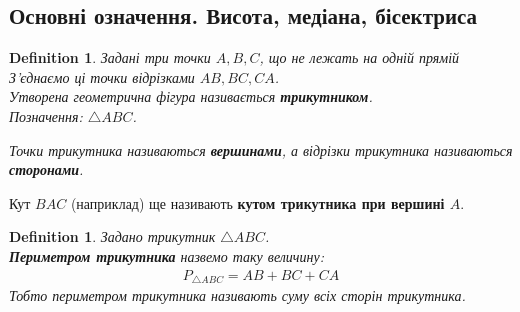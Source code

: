 \documentclass[a4paper, 10pt]{article}
\theoremstyle{theoremdd}
\theoremstyle{theoremdd}
\theoremstyle{theoremdd}
\newtheorem{definition}[theorem]{Definition}
\theoremstyle{theoremdd}
\theoremstyle{theoremdd}
\theoremstyle{theoremdd}
\theoremstyle{theoremdd}
\theoremstyle{theoremdd}
\theoremstyle{theoremdd}
\begin{document}
\subsection{Основні означення. Висота, медіана, бісектриса}
\begin{definition}
Задані три точки $A,B,C$, що не лежать на одній прямій З'єднаємо ці точки відрізками $AB,BC,CA$.\\
Утворена геометрична фігура називається \textbf{трикутником}.\\
Позначення: $\triangle ABC$.
\begin{figure}[H]
\centering
{}
\end{figure}
Точки трикутника називаються \textbf{вершинами}, а відрізки трикутника називаються \textbf{сторонами}.
\end{definition}

Кут $BAC$ (наприклад) ще називають \textbf{кутом трикутника при вершині $A$}.

\begin{definition} Задано трикутник $\triangle ABC$.\\
\textbf{Периметром трикутника} назвемо таку величину:
\begin{align*}
P_{\triangle ABC} = AB + BC + CA
\end{align*}
Тобто периметром трикутника називають суму всіх сторін трикутника.
\end{definition}

\end{document}
